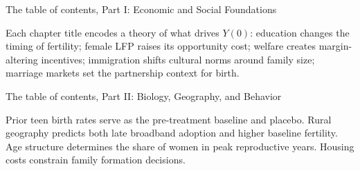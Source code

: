 \documentclass[aspectratio=169,12pt]{beamer}
\begin{document}
\begin{frame}{The table of contents, Part I: Economic and Social Foundations}

\vspace{0.2em}
\begin{center}
\end{center}

\vspace{0.5em}
{\small\color{OldMortar}
Each chapter title encodes a theory of what drives $Y(0)$: education changes
the timing of fertility; female LFP raises its opportunity cost;
welfare creates margin-altering incentives; immigration shifts cultural norms
around family size; marriage markets set the partnership context for birth.}

\end{frame}

\begin{frame}{The table of contents, Part II: Biology, Geography, and Behavior}

\vspace{0.2em}
\begin{center}
\end{center}

\vspace{0.5em}
{\small\color{OldMortar}
Prior teen birth rates serve as the pre-treatment baseline and placebo.
Rural geography predicts both late broadband adoption and higher baseline fertility.
Age structure determines the share of women in peak reproductive years.
Housing costs constrain family formation decisions.}

\end{frame}
\end{document}
